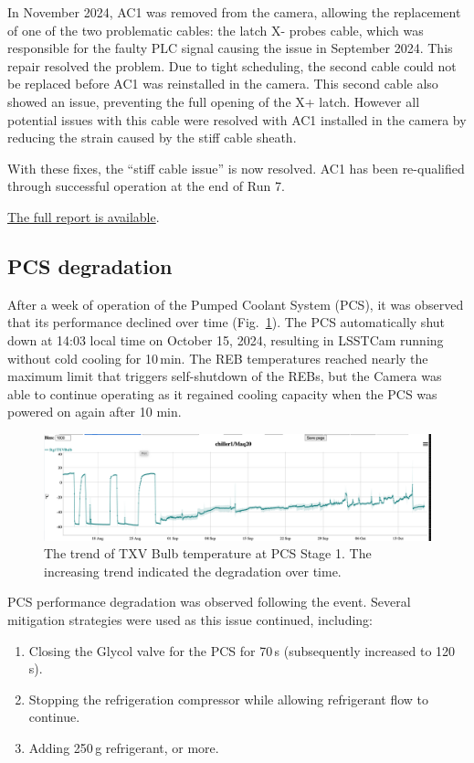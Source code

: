 In November 2024, AC1 was removed from the camera, allowing the replacement of one of the two problematic cables: the latch X- probes cable, which was responsible for the faulty PLC signal causing the issue in September 2024. This repair resolved the problem. Due to tight scheduling, the second cable could not be replaced before AC1 was reinstalled in the camera. This second cable also showed an issue, preventing the full opening of the X+ latch. However all potential  issues with this cable were resolved with AC1 installed in the camera by reducing the strain caused by the stiff cable sheath.

With these fixes, the ``stiff cable issue” is now resolved. AC1 has been re-qualified through successful operation at the end of Run 7.

\href{https://rubinobs.atlassian.net/browse/FRACAS-241}{The full report is available}.

\clearpage
\subsection{PCS degradation}\label{sec:pcsdegradation}
After a week of operation of the Pumped Coolant System (PCS), it was observed that its performance declined over time (Fig.~\ref{fig:pcsdegradation}). The PCS automatically shut down at 14:03 local time on October 15, 2024, resulting in LSSTCam running without cold cooling for 10\,min. The REB temperatures reached nearly the maximum limit that triggers self-shutdown of the REBs, but the Camera was able to continue operating as it regained cooling capacity when the PCS was powered on again after 10 min.

\begin{figure}[ht]
    \centering
    \includegraphics[width=1\linewidth]{figures//Issues/PCSTXVBulbAug11toOct17.png}
    \caption{The trend of TXV Bulb temperature at PCS Stage 1. The increasing trend indicated the degradation over time.}
    \label{fig:pcsdegradation}
\end{figure}

PCS performance degradation was observed following the event. Several mitigation strategies were used as this issue continued, including:
\begin{enumerate}
    

\item Closing the Glycol valve for the PCS for 70\,s (subsequently increased to 120\,s).
\item Stopping the refrigeration compressor while allowing refrigerant flow to continue.
\item Adding 250\,g refrigerant, or more.

\end{enumerate}

